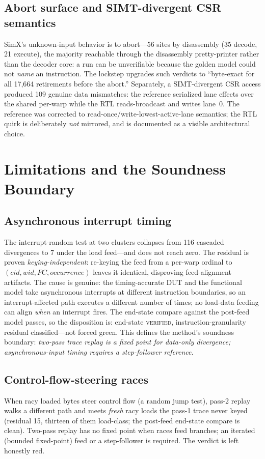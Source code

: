 \documentclass[conference]{IEEEtran}
\newcommand{\code}[1]{\texttt{\detokenize{#1}}}
\begin{document}
\subsection{Abort surface and SIMT-divergent CSR semantics}
SimX's unknown-input behavior is to abort---56 \code{std::abort} sites
by disassembly (35 decode, 21 execute), the majority reachable through
the disassembly pretty-printer rather than the decoder core: a run can
be unverifiable because the golden model could not \emph{name} an
instruction. The lockstep upgrades such verdicts to ``byte-exact for all
17{,}664 retirements before the abort.'' Separately, a SIMT-divergent
CSR access produced 109 genuine data mismatches: the reference
serialized lane effects over the shared per-warp \code{fcsr} while the
RTL reads-broadcast and writes lane~0. The reference was corrected to
read-once/write-lowest-active-lane semantics; the RTL quirk is
deliberately \emph{not} mirrored, and is documented as a visible
architectural choice.

\section{Limitations and the Soundness Boundary}
\label{sec:limits}

\subsection{Asynchronous interrupt timing}
The interrupt-random test at two clusters collapses from 116 cascaded
divergences to 7 under the load feed---and does not reach zero. The
residual is proven \emph{keying-independent}: re-keying the feed from a
per-warp ordinal to $(\textit{cid},\textit{wid},\textit{PC},
	\textit{occurrence})$ leaves it identical, disproving feed-alignment
artifacts. The cause is genuine: the timing-accurate DUT and the
functional model take asynchronous interrupts at different instruction
boundaries, so an interrupt-affected path executes a different number of
times; no load-data feeding can align \emph{when} an interrupt fires.
The end-state compare against the post-feed model passes, so the
disposition is: end-state \textsc{verified}, instruction-granularity
residual classified---not forced green. This defines the method's
soundness boundary: \emph{two-pass trace replay is a fixed point for
	data-only divergence; asynchronous-input timing requires a
	step-follower reference}.

\subsection{Control-flow-steering races}
When racy loaded bytes steer control flow (a random jump test), pass-2
replay walks a different path and meets \emph{fresh} racy loads the
pass-1 trace never keyed (residual 15, thirteen of them load-class; the post-feed
end-state compare is clean). Two-pass replay has no fixed point when
races feed branches; an iterated (bounded fixed-point) feed or a
step-follower is required. The verdict is left honestly red.
\end{document}
